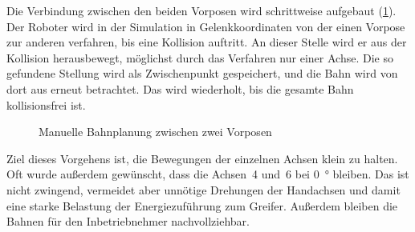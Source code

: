 Die Verbindung zwischen den beiden Vorposen wird schrittweise aufgebaut
(\cref{fig:vp-manuell}). Der Roboter wird in der Simulation in Gelenkkoordinaten von der einen
Vorpose zur anderen verfahren, bis eine Kollision auftritt. An dieser Stelle wird er aus der
Kollision herausbewegt, möglichst durch das Verfahren nur einer Achse. Die so gefundene Stellung
wird als Zwischenpunkt gespeichert, und die Bahn wird von dort aus erneut betrachtet. Das wird
wiederholt, bis die gesamte Bahn kollisionsfrei ist.

\begin{figure}[htbp]
  \centering
  \caption{Manuelle Bahnplanung zwischen zwei Vorposen}
  \label{fig:vp-manuell}
\end{figure}

Ziel dieses Vorgehens ist, die Bewegungen der einzelnen Achsen klein zu halten. Oft wurde
außerdem gewünscht, dass die Achsen~4 und~6 bei \SI{0}{\degree} bleiben. Das ist nicht
zwingend, vermeidet aber unnötige Drehungen der Handachsen und damit eine starke Belastung der
Energiezuführung zum Greifer. Außerdem bleiben die Bahnen für den Inbetriebnehmer
nachvollziehbar.

